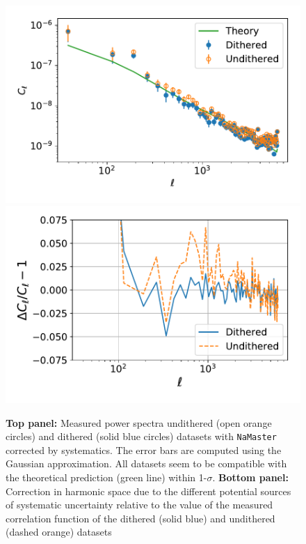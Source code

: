 \documentclass[twocolumn]{aastex62}
\begin{document}
\begin{figure}
\centering
\includegraphics[width=0.9\columnwidth]{Cl_25p3_errors}
\includegraphics[width=0.9\columnwidth]{Cl_25p3_sys_comparison}
\caption{{\bf Top panel:} Measured power spectra undithered (open orange circles) and dithered (solid blue circles) datasets with \texttt{NaMaster} corrected by systematics. The error bars are computed using the Gaussian approximation. All datasets seem to be compatible with the theoretical prediction (green line) within 1-$\sigma$. {\bf Bottom panel:} Correction in harmonic space due to the different potential sources of systematic uncertainty relative to the value of the measured correlation function of the dithered (solid blue) and undithered (dashed orange) datasets}
\label{fig:power_spectra}
\end{figure}
\end{document}
